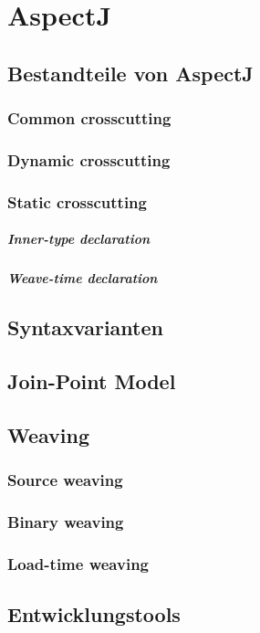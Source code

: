 \chapter{AspectJ}
\label{chap:aspectj}

\section{Bestandteile von AspectJ}

\subsection{Common crosscutting}

\subsection{Dynamic crosscutting}

\subsection{Static crosscutting}

\paragraph{Inner-type declaration}

\paragraph{Weave-time declaration}

\section{Syntaxvarianten}

\section{Join-Point Model}

\section{Weaving}

\subsection{Source weaving}

\subsection{Binary weaving}

\subsection{Load-time weaving}

\section{Entwicklungstools}